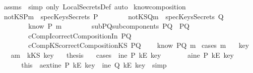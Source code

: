 \begin{isabellebody}
\endisadelimproof
\isatagproof
{}\isamarkupfalse \ assms\ \isamarkupfalse \ {\isacharparenleft}simp\ only{\isacharcolon}\ LocalSecretsDef{\isacharcomma}\ auto{\isacharparenright}\endisatagproof
{\isafoldproof}\isadelimproof
\isanewline
\endisadelimproof
\isanewline
{}\isamarkupfalse \ know{\isacharunderscore}composition{}{\isacharcolon}\isanewline
{}\ notKSP{\isacharcolon}{\isachardoublequoteopen}m\ {\isasymnotin}\ specKeysSecrets\ P{\isachardoublequoteclose}\isanewline
\ \ \ \ \ \ \ \ notKSQ{\isacharcolon}{\isachardoublequoteopen}m\ {\isasymnotin}\ specKeysSecrets\ Q{\isachardoublequoteclose}\isanewline
\ \ \ \ \ \ \ \ {\isachardoublequoteopen}know\ P\ m{\isachardoublequoteclose}\isanewline
\ \ \ \ \ \ \ \ subPQ{\isacharcolon}{\isachardoublequoteopen}subcomponents\ PQ\ {\isacharequal}\ {\isacharbraceleft}P{\isacharcomma}Q{\isacharbraceright}{\isachardoublequoteclose}\ \isanewline
\ \ \ \ \ \ \ \ cCompI{\isacharcolon}{\isachardoublequoteopen}correctCompositionIn\ PQ{\isachardoublequoteclose}\isanewline
\ \ \ \ \ \ \ \ cCompKS{\isacharcolon}{\isachardoublequoteopen}correctCompositionKS\ PQ{\isachardoublequoteclose}\isanewline
{}\ \ \ \ {\isachardoublequoteopen}know\ PQ\ m{\isachardoublequoteclose}\isanewline
\isadelimproof
\endisadelimproof
\isatagproof
{}\isamarkupfalse \ {\isacharparenleft}cases\ m{\isacharparenright}\isanewline
\ \ \isamarkupfalse \ key\isanewline
\ \ \isamarkupfalse \ a{}{\isacharcolon}{\isachardoublequoteopen}m\ {\isacharequal}\ kKS\ key{\isachardoublequoteclose}\isanewline
\ \ \isamarkupfalse \ {\isacharquery}thesis\isanewline
\ \ \isamarkupfalse \ {\isacharparenleft}cases\ \ {\isachardoublequoteopen}ine\ P\ {\isacharparenleft}kE\ key{\isacharparenright}{\isachardoublequoteclose}{\isacharparenright}\ \isanewline
\ \ \ \ \ \isamarkupfalse \ a{}{}{\isacharcolon}{\isachardoublequoteopen}ine\ P\ {\isacharparenleft}kE\ key{\isacharparenright}{\isachardoublequoteclose}\ \isanewline
\ \ \ \ \ \isamarkupfalse \ this\ \isamarkupfalse \ a{}{}ext{\isacharcolon}{\isachardoublequoteopen}ine\ P\ {\isacharparenleft}kE\ key{\isacharparenright}\ {\isacharbar}\ ine\ Q\ {\isacharparenleft}kE\ key{\isacharparenright}{\isachardoublequoteclose}\ \isamarkupfalse \ simp\isanewline

\end{isabellebody}
